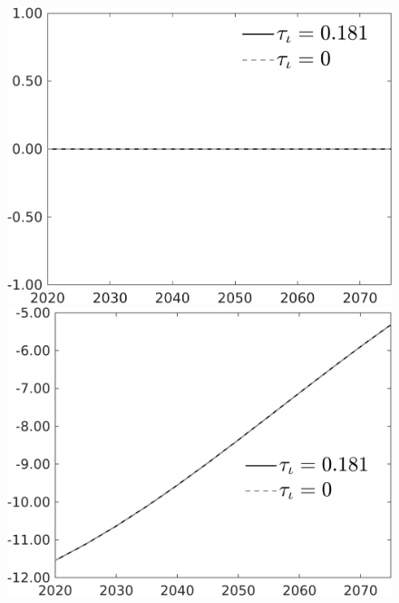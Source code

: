 \documentclass[12pt]{article}
\begin{document}
\begin{figure}[h!!]
\begin{minipage}[]{0.32\textwidth}
\end{minipage}	\begin{minipage}[]{0.32\textwidth}
\includegraphics[width=1\textwidth]{../../codding_model/own_basedOnFried/optimalPol_010922_revision/figures/all_13Sept22/PerdifNoTauf_Equlab_regime0_CompTaul_sg_spillover0_nsk0_xgr1_knspil1_sep1_LFlimit0_emsbase0_countec0_GovRev0_etaa0.79_lgd1.png}
\end{minipage}
		\begin{minipage}[]{0.32\textwidth}
	\includegraphics[width=1\textwidth]{../../codding_model/own_basedOnFried/optimalPol_010922_revision/figures/all_13Sept22/PerdifNoTauf_Equlab_regime0_CompTaul_wsn_spillover0_nsk0_xgr1_knspil1_sep1_LFlimit0_emsbase0_countec0_GovRev0_etaa0.79_lgd1.png}

\end{minipage}
\end{figure}
\end{document}
